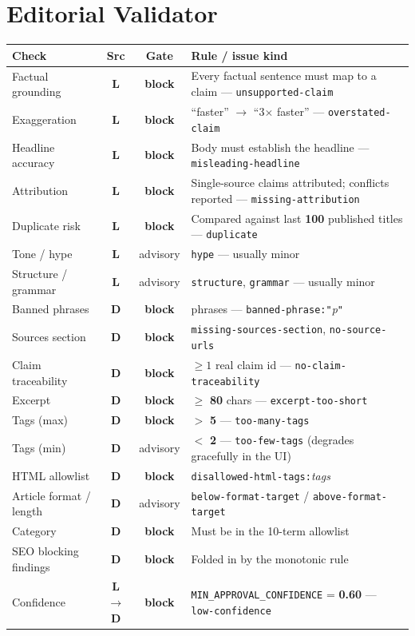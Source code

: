 \documentclass[10pt,a4paper]{article}
\newcommand{\cd}[1]{\texttt{\footnotesize\hyphenpenalty=0\exhyphenpenalty=0\relax #1}}
\newcommand{\us}{\_\discretionary{}{}{}}
\newcommand{\D}{\textcolor{go}{\textbf{D}}}
\newcommand{\Lm}{\textcolor{ac}{\textbf{L}}}
\newcommand{\LD}{\textcolor{hd}{\textbf{L$\rightarrow$D}}}
\newcommand{\BL}{\textcolor{st}{\textbf{block}}}
\newcommand{\AD}{\textcolor{hd}{advisory}}
\begin{document}
\section{Editorial Validator}

\begin{center}\footnotesize
\begin{tabularx}{\textwidth}{@{}>{\RaggedRight}p{4.0cm} c c >{\RaggedRight}X@{}}
\toprule
\textbf{Check} & \textbf{Src} & \textbf{Gate} & \textbf{Rule / issue kind} \\
\midrule
Factual grounding & \Lm & \BL & Every factual sentence must map to a claim --- \cd{unsupported-claim} \\
Exaggeration & \Lm & \BL & ``faster'' $\rightarrow$ ``3$\times$ faster'' --- \cd{overstated-claim} \\
Headline accuracy & \Lm & \BL & Body must establish the headline --- \cd{misleading-headline} \\
Attribution & \Lm & \BL & Single-source claims attributed; conflicts reported --- \cd{missing-attribution} \\
Duplicate risk & \Lm & \BL & Compared against last \textbf{100} published titles --- \cd{duplicate} \\
Tone / hype & \Lm & \AD & \cd{hype} --- usually minor \\
Structure / grammar & \Lm & \AD & \cd{structure}, \cd{grammar} --- usually minor \\
Banned phrases & \D & \BL & 15 phrases --- \cd{banned-phrase:"}\textit{p}\cd{"} \\
Sources section & \D & \BL & \cd{missing-sources-section}, \cd{no-source-urls} \\
Claim traceability & \D & \BL & $\geq 1$ real claim id --- \cd{no-claim-traceability} \\
Excerpt & \D & \BL & $\geq$ \textbf{80} chars --- \cd{excerpt-too-short} \\
Tags (max) & \D & \BL & $>$ \textbf{5} --- \cd{too-many-tags} \\
Tags (min) & \D & \AD & $<$ \textbf{2} --- \cd{too-few-tags} (degrades gracefully in the UI) \\
HTML allowlist & \D & \BL & \cd{disallowed-html-tags:}\textit{tags} \\
Article format / length & \D & \AD & \cd{below-format-target} / \cd{above-format-target} \\
Category & \D & \BL & Must be in the 10-term allowlist \\
SEO blocking findings & \D & \BL & Folded in by the monotonic rule \\
Confidence & \LD & \BL & \cd{MIN\us APPROVAL\us CONFIDENCE} = \textbf{0.60} --- \cd{low-confidence} \\
\bottomrule
\end{tabularx}
\end{center}
\end{document}
